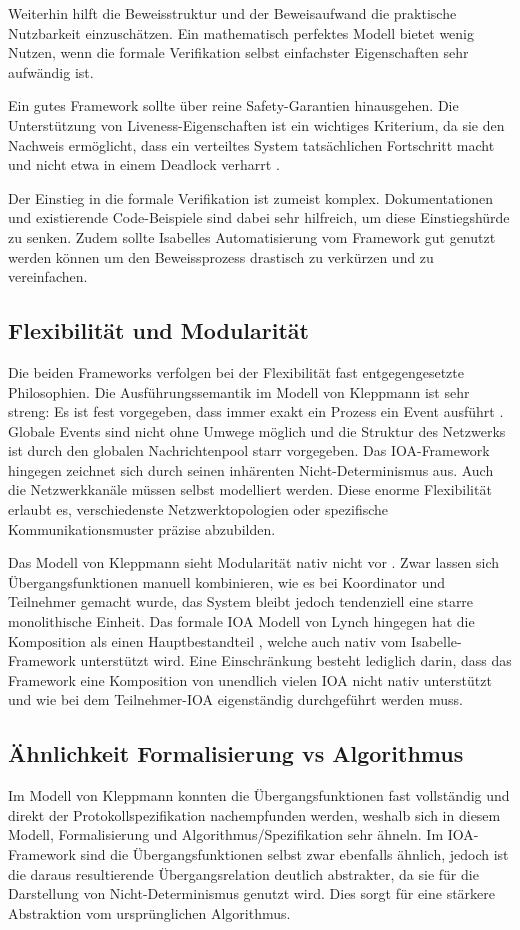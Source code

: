 \documentclass[12pt,a4paper]{tucarticle2019}
\begin{document}
	Weiterhin hilft die Beweisstruktur und der Beweisaufwand die praktische Nutzbarkeit einzuschätzen. Ein mathematisch perfektes Modell bietet wenig Nutzen, wenn die formale Verifikation selbst einfachster Eigenschaften sehr aufwändig ist. 
	
	Ein gutes Framework sollte über reine Safety-Garantien hinausgehen. Die Unterstützung von Liveness-Eigenschaften ist ein wichtiges Kriterium, da sie den Nachweis ermöglicht, dass ein verteiltes System tatsächlichen Fortschritt macht und nicht etwa in einem Deadlock verharrt \cite{kleppmannblog}.
	
	Der Einstieg in die formale Verifikation ist zumeist komplex. Dokumentationen und existierende Code-Beispiele sind dabei sehr hilfreich, um diese Einstiegshürde zu senken. Zudem sollte Isabelles Automatisierung vom Framework gut genutzt werden können um den Beweissprozess drastisch zu verkürzen und zu vereinfachen.
	 
	\subsection{Flexibilität und Modularität}
	Die beiden Frameworks verfolgen bei der Flexibilität fast entgegengesetzte Philosophien. Die Ausführungssemantik im Modell von Kleppmann ist sehr streng: Es ist fest vorgegeben, dass immer exakt ein Prozess ein Event ausführt \cite{kleppmannblog}. Globale Events sind nicht ohne Umwege möglich und die Struktur des Netzwerks ist durch den globalen Nachrichtenpool starr vorgegeben.
	Das IOA-Framework hingegen zeichnet sich durch seinen inhärenten Nicht-Determinismus aus. Auch die Netzwerkkanäle müssen selbst modelliert werden. Diese enorme Flexibilität erlaubt es, verschiedenste Netzwerktopologien oder spezifische Kommunikationsmuster präzise abzubilden.
	
	Das Modell von Kleppmann sieht Modularität nativ nicht vor \cite{lynchbook}. Zwar lassen sich Übergangsfunktionen manuell kombinieren, wie es bei Koordinator und Teilnehmer gemacht wurde, das System bleibt jedoch tendenziell eine starre monolithische Einheit. 
	Das formale IOA Modell von Lynch hingegen hat die Komposition als einen Hauptbestandteil \cite{lynchbook}, welche auch nativ vom Isabelle-Framework unterstützt wird. Eine Einschränkung besteht lediglich darin, dass das Framework eine Komposition von unendlich vielen IOA nicht nativ unterstützt und wie bei dem Teilnehmer-IOA eigenständig durchgeführt werden muss.
	
	\subsection{Ähnlichkeit Formalisierung vs Algorithmus}
	Im Modell von Kleppmann konnten die Übergangsfunktionen fast vollständig und direkt der Protokollspezifikation nachempfunden werden, weshalb sich in diesem Modell, Formalisierung und Algorithmus/Spezifikation sehr ähneln.
	Im IOA-Framework sind die Übergangsfunktionen selbst zwar ebenfalls ähnlich, jedoch ist die daraus resultierende Übergangsrelation deutlich abstrakter, da sie für die Darstellung von Nicht-Determinismus genutzt wird. Dies sorgt für eine stärkere Abstraktion vom ursprünglichen Algorithmus.
\end{document}
